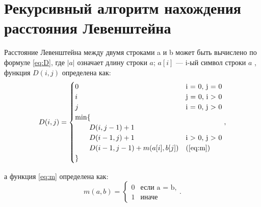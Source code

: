 \documentclass[12pt]{report}
\begin{document}
\section{Рекурсивный алгоритм нахождения расстояния Левенштейна}

Расстояние Левенштейна между двумя строками a и b может быть вычислено по формуле \ref{eq:D}, где $|a|$ означает длину строки $a$; $a[i]$ — i-ый символ строки $a$ , функция $D(i, j)$ определена как:
\begin{equation}
\label{eq:D}
D(i, j) = \begin{cases}
0 &\text{i = 0, j = 0}\\
i &\text{j = 0, i > 0}\\
j &\text{i = 0, j > 0}\\
\min \lbrace \\
\qquad D(i, j-1) + 1\\
\qquad D(i-1, j) + 1 &\text{i > 0, j > 0}\\
\qquad D(i-1, j-1) + m(a[i], b[j]) &\text(\ref{eq:m})\\
\rbrace
\end{cases},
\end{equation}

а функция \ref{eq:m} определена как:
\begin{equation}
\label{eq:m}
m(a, b) = \begin{cases}
0 &\text{если a = b,}\\
1 &\text{иначе}
\end{cases}.
\end{equation}
\end{document}

